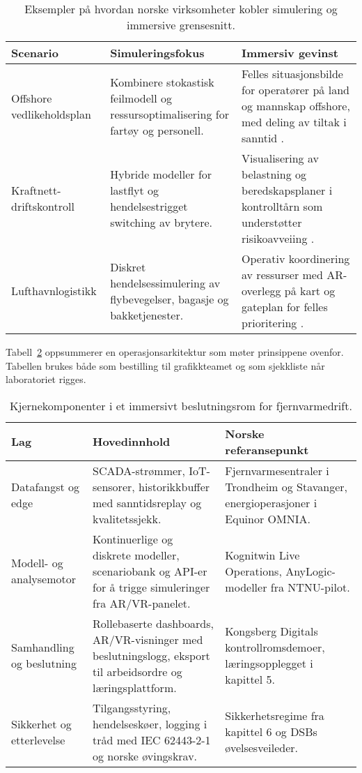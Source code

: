 \begin{table}[htbp]
    \centering
    \begin{tabular}{p{}p{}p{}}
        \toprule
        \textbf{Scenario} & \textbf{Simuleringsfokus} & \textbf{Immersiv gevinst}\\
        \midrule
        Offshore vedlikeholdsplan & Kombinere stokastisk feilmodell og ressursoptimalisering for fartøy og personell. & Felles situasjonsbilde for operatører på land og mannskap offshore, med deling av tiltak i sanntid \citep{cognite2023akerbp}.\\
        Kraftnett-driftskontroll & Hybride modeller for lastflyt og hendelsestrigget switching av brytere. & Visualisering av belastning og beredskapsplaner i kontrolltårn som understøtter risikoavveiing \citep{statnett2024kontrolltarn}.\\
        Lufthavnlogistikk & Diskret hendelsessimulering av flybevegelser, bagasje og bakketjenester. & Operativ koordinering av ressurser med AR-overlegg på kart og gateplan for felles prioritering \citep{avinor2022digital}.\\
        \bottomrule
    \end{tabular}
    \caption{Eksempler på hvordan norske virksomheter kobler simulering og immersive grensesnitt.}
    \label{tab:kap04-immersive-scenarier}
\end{table}

Tabell~\ref{tab:kap04-immersiv-arkitektur} oppsummerer en operasjonsarkitektur som møter prinsippene ovenfor. Tabellen brukes både som bestilling til grafikkteamet og som sjekkliste når laboratoriet rigges.

\begin{table}[htbp]
    \centering
    \begin{tabular}{p{}p{}p{}}
        \toprule
        \textbf{Lag} & \textbf{Hovedinnhold} & \textbf{Norske referansepunkt}\\
        \midrule
        Datafangst og edge & SCADA-strømmer, IoT-sensorer, historikkbuffer med sanntidsreplay og kvalitetssjekk. & Fjernvarmesentraler i Trondheim og Stavanger, energioperasjoner i Equinor OMNIA.\\
        Modell- og analysemotor & Kontinuerlige og diskrete modeller, scenariobank og API-er for å trigge simuleringer fra AR/VR-panelet. & Kognitwin Live Operations, AnyLogic-modeller fra NTNU-pilot.\\
        Samhandling og beslutning & Rollebaserte dashboards, AR/VR-visninger med beslutningslogg, eksport til arbeidsordre og læringsplattform. & Kongsberg Digitals kontrollromsdemoer, læringsopplegget i kapittel 5.\\
        Sikkerhet og etterlevelse & Tilgangsstyring, hendelseskøer, logging i tråd med IEC 62443-2-1 og norske øvingskrav. & Sikkerhetsregime fra kapittel 6 og DSBs øvelsesveileder.\\
        \bottomrule
    \end{tabular}
    \caption{Kjernekomponenter i et immersivt beslutningsrom for fjernvarmedrift.}
    \label{tab:kap04-immersiv-arkitektur}
\end{table}

